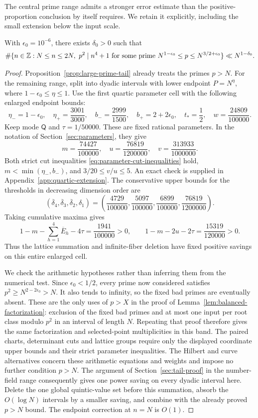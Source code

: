 The central prime range admits a stronger error estimate than the
positive-proportion conclusion by itself requires. We retain it
explicitly, including the small extension below the input scale.

\begin{proposition}\label{prop:cyclotomic-central}
With $\epsilon_0=10^{-6}$, there exists $\delta_0>0$ such that
\[
 \#\{n\in\mathbb Z:N\le n\le2N,\ p^2\mid n^4+1\text{ for some prime }
       N^{1-\epsilon_0}\le p\le N^{3/2+\epsilon_0}\}
 \ll N^{1-\delta_0}.
\]
\end{proposition}

\begin{proof}
Proposition~\ref{prop:large-prime-tail} already treats the primes
$p>N$. For the remaining range, split into dyadic intervals with
lower endpoint $P=N^\eta$, where $1-\epsilon_0\le\eta\le1$.
Use the first quartic parameter cell with the following enlarged
endpoint bounds:
\[
 \eta_-=1-\epsilon_0,\quad \eta_+=\frac{3001}{3000},\quad
 b_-=\frac{2999}{1500},\quad b_+=2+2\epsilon_0,
 \quad t_* =\frac12,\quad w=\frac{24809}{100000}.
\]
Keep mode $\mathsf Q$ and $\tau=1/50000$. These are fixed rational
parameters. In the notation of Section~\ref{sec:parameters}, they give
\[
 m=\frac{74427}{100000},\quad
 u=\frac{76819}{1200000},\quad
 v=\frac{313933}{1000000}.
\]
Both strict cut inequalities \eqref{eq:parameter-cut-inequalities}
hold, $m<\min(\eta_-,b_-)$, and $3/20\le v/u\le5$.
An exact check is supplied in Appendix~\ref{app:quartic-extension}.
The conservative upper bounds for the thresholds in decreasing
dimension order are
\[
 (\overline\delta_4,\overline\delta_3,
   \overline\delta_2,\delta_1)
 =\left(\frac{4729}{100000},\frac{5097}{100000},
         \frac{6899}{100000},\frac{76819}{1200000}\right).
\]
Taking cumulative maxima gives
\[
 1-m-\sum_{h=1}^4\overline E_h-4\tau
   =\frac{1941}{100000}>0,\qquad
 1-m-2u-2\tau=\frac{15319}{120000}>0.
\]
Thus the lattice summation and infinite-fiber deletion have fixed
positive savings on this entire enlarged cell.

We check the arithmetic hypotheses rather than inferring them from
the numerical test. Since $\epsilon_0<1/2$, every prime now considered
satisfies $p^2\ge N^{2-2\epsilon_0}>N$. It also tends to infinity,
so the fixed bad primes are eventually absent. These are the only
uses of $p>X$ in the proof of
Lemma~\ref{lem:balanced-factorization}: exclusion of the fixed bad
primes and at most one input per root class modulo $p^2$ in an
interval of length $N$. Repeating that proof therefore gives the
same factorization and selected-point multiplicities in this band.
The paired charts, determinant cuts and lattice groups require only
the displayed coordinate upper bounds and their strict parameter
inequalities. The Hilbert and curve alternatives concern these
arithmetic equations and weights and impose no further condition
$p>N$. The argument of Section~\ref{sec:tail-proof} in the
number-field range consequently gives one power saving on every
dyadic interval here. Delete the one global quintic-value set before
this summation, absorb the $O(\log N)$ intervals by a smaller saving,
and combine with the already proved $p>N$ bound. The endpoint
correction at $n=N$ is $O(1)$.
\end{proof}

